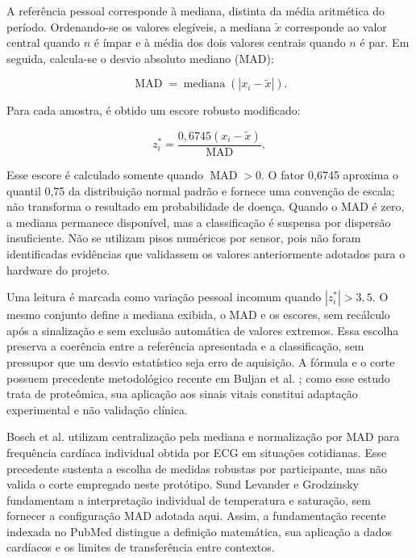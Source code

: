 \documentclass[12pt]{article}
\begin{document}
A referência pessoal corresponde à mediana, distinta da média aritmética do período. Ordenando-se os valores elegíveis, a mediana $\widetilde{x}$ corresponde ao valor central quando $n$ é ímpar e à média dos dois valores centrais quando $n$ é par. Em seguida, calcula-se o desvio absoluto mediano (MAD):

\begin{equation}
    \operatorname{MAD}=\operatorname{mediana}\left(\left|x_i-\widetilde{x}\right|\right).
    \label{eq:mad}
\end{equation}

Para cada amostra, é obtido um escore robusto modificado:

\begin{equation}
    z_i^{*}=\frac{0{,}6745\left(x_i-\widetilde{x}\right)}{\operatorname{MAD}},
    \label{eq:z-robusto}
\end{equation}

Esse escore é calculado somente quando $\operatorname{MAD}>0$. O fator 0,6745 aproxima o quantil 0,75 da distribuição normal padrão e fornece uma convenção de escala; não transforma o resultado em probabilidade de doença. Quando o MAD é zero, a mediana permanece disponível, mas a classificação é suspensa por dispersão insuficiente. Não se utilizam pisos numéricos por sensor, pois não foram identificadas evidências que validassem os valores anteriormente adotados para o hardware do projeto.

Uma leitura é marcada como variação pessoal incomum quando $|z_i^{*}|>3{,}5$. O mesmo conjunto define a mediana exibida, o MAD e os escores, sem recálculo após a sinalização e sem exclusão automática de valores extremos. Essa escolha preserva a coerência entre a referência apresentada e a classificação, sem pressupor que um desvio estatístico seja erro de aquisição. A fórmula e o corte possuem precedente metodológico recente em Buljan et al. \cite{buljan2023framework}; como esse estudo trata de proteômica, sua aplicação aos sinais vitais constitui adaptação experimental e não validação clínica.

Bosch et al. \cite{bosch2025travel} utilizam centralização pela mediana e normalização por MAD para frequência cardíaca individual obtida por ECG em situações cotidianas. Esse precedente sustenta a escolha de medidas robustas por participante, mas não valida o corte empregado neste protótipo. Sund Levander e Grodzinsky \cite{sundlevander2024individual} fundamentam a interpretação individual de temperatura e saturação, sem fornecer a configuração MAD adotada aqui. Assim, a fundamentação recente indexada no PubMed distingue a definição matemática, sua aplicação a dados cardíacos e os limites de transferência entre contextos.
\end{document}
